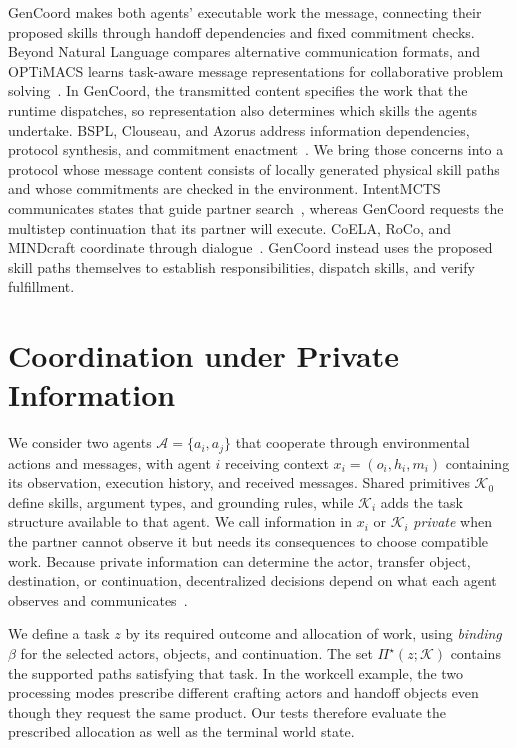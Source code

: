 \documentclass[sigconf,nonacm,balance=false]{aamas}
\begin{document}
GenCoord makes both agents' executable work the message, connecting their proposed skills through handoff dependencies and fixed commitment checks. Beyond Natural Language compares alternative communication formats, and OPTiMACS learns task-aware message representations for collaborative problem solving~\cite{chen2024beyond,gupta2026optimacs}. In GenCoord, the transmitted content specifies the work that the runtime dispatches, so representation also determines which skills the agents undertake. BSPL, Clouseau, and Azorus address information dependencies, protocol synthesis, and commitment enactment~\cite{singh2011bspl,singh2020clouseau,chopra2025azorus}. We bring those concerns into a protocol whose message content consists of locally generated physical skill paths and whose commitments are checked in the environment. IntentMCTS communicates states that guide partner search~\cite{aamas2025_p481}, whereas GenCoord requests the multistep continuation that its partner will execute. CoELA, RoCo, and MINDcraft coordinate through dialogue~\cite{zhang2024coela,mandi2024roco,white2025collaborating}. GenCoord instead uses the proposed skill paths themselves to establish responsibilities, dispatch skills, and verify fulfillment.

\section{Coordination under Private Information}
\label{sec:information}
We consider two agents $\mathcal A=\{a_i,a_j\}$ that cooperate through environmental actions and messages, with agent $i$ receiving context $x_i=(o_i,h_i,m_i)$ containing its observation, execution history, and received messages. Shared primitives $\mathcal K_0$ define skills, argument types, and grounding rules, while $\mathcal K_i$ adds the task structure available to that agent. We call information in $x_i$ or $\mathcal K_i$ \emph{private} when the partner cannot observe it but needs its consequences to choose compatible work. Because private information can determine the actor, transfer object, destination, or continuation, decentralized decisions depend on what each agent observes and communicates~\cite{bernstein2002decentralized}.

We define a task $z$ by its required outcome and allocation of work, using \emph{binding} $\beta$ for the selected actors, objects, and continuation. The set $\Pi^\star(z;\mathcal K)$ contains the supported paths satisfying that task. In the workcell example, the two processing modes prescribe different crafting actors and handoff objects even though they request the same product. Our tests therefore evaluate the prescribed allocation as well as the terminal world state.
\end{document}
